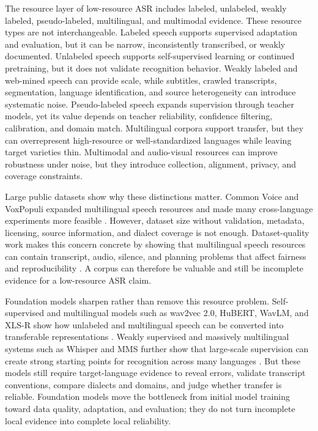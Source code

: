 \documentclass[pdflatex,sn-basic]{sn-jnl}
\theoremstyle{thmstyleone}
\theoremstyle{thmstyletwo}
\theoremstyle{thmstylethree}
\begin{document}
The resource layer of low-resource ASR includes labeled, unlabeled, weakly labeled, pseudo-labeled, multilingual, and multimodal evidence. These resource types are not interchangeable. Labeled speech supports supervised adaptation and evaluation, but it can be narrow, inconsistently transcribed, or weakly documented. Unlabeled speech supports self-supervised learning or continued pretraining, but it does not validate recognition behavior. Weakly labeled and web-mined speech can provide scale, while subtitles, crawled transcripts, segmentation, language identification, and source heterogeneity can introduce systematic noise. Pseudo-labeled speech expands supervision through teacher models, yet its value depends on teacher reliability, confidence filtering, calibration, and domain match. Multilingual corpora support transfer, but they can overrepresent high-resource or well-standardized languages while leaving target varieties thin. Multimodal and audio-visual resources can improve robustness under noise, but they introduce collection, alignment, privacy, and coverage constraints.

Large public datasets show why these distinctions matter. Common Voice and VoxPopuli expanded multilingual speech resources and made many cross-language experiments more feasible \citep{ardila2020commonvoice,wang2021voxpopuli}. However, dataset size without validation, metadata, licensing, source information, and dialect coverage is not enough. Dataset-quality work makes this concern concrete by showing that multilingual speech resources can contain transcript, audio, silence, and planning problems that affect fairness and reproducibility \citep{lau2025_data_quality_multilingual_speech}. A corpus can therefore be valuable and still be incomplete evidence for a low-resource ASR claim.

Foundation models sharpen rather than remove this resource problem. Self-supervised and multilingual models such as wav2vec 2.0, HuBERT, WavLM, and XLS-R show how unlabeled and multilingual speech can be converted into transferable representations \citep{baevski2020wav2vec2,hsu2021hubert,chen2022wavlm,babu22_interspeech}. Weakly supervised and massively multilingual systems such as Whisper and MMS further show that large-scale supervision can create strong starting points for recognition across many languages \citep{pmlr-v202-radford23a,pratap2024mms}. But these models still require target-language evidence to reveal errors, validate transcript conventions, compare dialects and domains, and judge whether transfer is reliable. Foundation models move the bottleneck from initial model training toward data quality, adaptation, and evaluation; they do not turn incomplete local evidence into complete local reliability.
\end{document}
